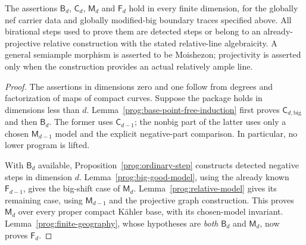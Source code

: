 

\begin{theorem}
\label{prog:restricted-package}
The assertions $\mathsf B_d$, $\mathsf C_d$, $\mathsf M_d$ and
$\mathsf F_d$ hold in every finite dimension, for the globally nef
carrier data and globally modified-big boundary traces specified above.
All birational steps used to prove them are detected steps or belong
to an already-projective relative construction with the stated
relative-line algebraicity. A general semiample morphism is asserted
to be Moishezon; projectivity is asserted only when the construction
provides an actual relatively ample line.
\end{theorem}
\begin{proof}
The assertions in dimensions zero and one follow from degrees and
factorization of maps of compact curves. Suppose the package holds
in dimensions less than $d$. Lemma~\ref{prog:base-point-free-induction}
first proves $\mathsf C_{d,\mathrm{big}}$ and then $\mathsf B_d$.
The former uses $\mathsf C_{d-1}$; the nonbig part of the latter
uses only a chosen $\mathsf M_{d-1}$ model and the explicit
negative-part comparison. In particular, no lower program is lifted.

With $\mathsf B_d$ available, Proposition~\ref{prog:ordinary-step}
constructs detected negative steps in dimension $d$.
Lemma~\ref{prog:big-good-model}, using the already known
$\mathsf F_{d-1}$, gives the big-shift case of $\mathsf M_d$.
Lemma~\ref{prog:relative-model} gives its remaining case, using
$\mathsf M_{d-1}$ and the projective graph construction. This proves
$\mathsf M_d$ over every proper compact K\"ahler base, with its
chosen-model invariant. Lemma~\ref{prog:finite-geography}, whose
hypotheses are \emph{both} $\mathsf B_d$ and $\mathsf M_d$, now
proves $\mathsf F_d$.


\end{proof}
